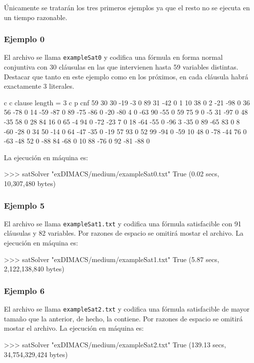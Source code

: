 Únicamente se tratarán los tres primeros ejemplos ya que el resto no se ejecuta en un tiempo razonable.

\subsubsection{Ejemplo 0}
El archivo se llama \texttt{exampleSat0} y codifica una fórmula en forma normal conjuntiva con 30 cláusulas en las que intervienen hasta 59 variables distintas. Destacar que tanto en este ejemplo como en los próximos, en cada cláusula habrá exactamente 3 literales.

\begin{codigo}
c 
c    clause length = 3 
c
p cnf 59 30
30 -19 -3 0
89 31 -42 0
1 10 38 0
2 -21 -98 0
36 56 -78 0
14 -59 -87 0
89 -75 -86 0
-20 -80 4 0
-63 90 -55 0
59 75 9 0
-5 31 -97 0
48 -35 58 0
28 84 16 0
65 -4 94 0
-72 -23 7 0
18 -64 -55 0
-96 3 -35 0
89 -65 83 0
8 -60 -28 0
34 50 -14 0
64 -47 -35 0
-19 57 93 0
52 99 -94 0
-59 10 48 0
-78 -44 76 0
-63 -48 52 0
-88 84 -68 0
10 88 -76 0
92 -81 -88 0
\end{codigo}

La ejecución en máquina es:
\begin{code}
>>> satSolver "exDIMACS/medium/exampleSat0.txt"
True
(0.02 secs, 10,307,480 bytes)
\end{code}

\subsubsection{Ejemplo 5}
El archivo se llama \texttt{exampleSat1.txt} y codifica una fórmula satisfacible con 91 cláusulas y 82 variables. Por razones de espacio se omitirá mostar el archivo. La ejecución en máquina es:
\begin{code}
>>> satSolver "exDIMACS/medium/exampleSat1.txt"
True
(5.87 secs, 2,122,138,840 bytes)
\end{code}

\subsubsection{Ejemplo 6}
El archivo se llama \texttt{exampleSat2.txt} y codifica una fórmula satisfacible de mayor tamaño que la anterior, de hecho, la contiene. Por razones de espacio se omitirá mostar el archivo. La ejecución en máquina es:
\begin{code}
>>> satSolver "exDIMACS/medium/exampleSat2.txt"
True
(139.13 secs, 34,754,329,424 bytes)
\end{code}

